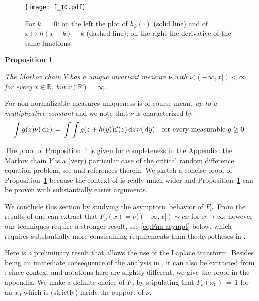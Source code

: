 \documentclass[reqno,11pt]{amsart}
\numberwithin{equation}{section}
\newtheorem{proposition}[theorem]{Proposition}
\newcommand{\dd}{\,\text{\rm d}}             %
\newcommand{\bbR}{{\ensuremath{\mathbb R}} }
\newcommand{\gz}{\zeta}
\begin{document}
\begin{figure}[h]
\centering
\texttt{[image: f\_10.pdf]}
\caption{\label{fig:1} For $k=10$: on the left the plot of $h_k(\cdot)$ (solid line) and of $x\mapsto h(x+k)-k$ (dashed line); on the right the derivative of the same functions. }
\end{figure}

\medskip

\begin{proposition}
\label{th:Y}
\begin{sloppypar}
	The Markov chain $Y$ has a unique   invariant measure $\nu$ with ${\nu((-\infty,x])< \infty}$ for every $x\in \bbR$, but
	$\nu(\bbR)= \infty$. 
\end{sloppypar}
\end{proposition}
\medskip

For non-normalizable measures uniqueness is of course meant \emph{up to  a multiplicative constant} and we note that $\nu$ is characterized by 
\begin{equation}
\label{eq:fornu}
\int  g(z) \nu (\dd z)\, =\, \int \int g(z +h(y)) \gz(z) \dd z \, \nu (\dd y)\ \ \text{ for every measurable } g \ge 0\,  .
\end{equation}

The proof of Proposition~\ref{th:Y} is  given for completeness in the Appendix: the Markov chain $Y$ is a (very) particular case of the critical   random difference equation problem, see   \cite{cf:BBE,cf:BBD,cf:BDMbook} and references therein. 
We sketch a concise proof of Proposition~\ref{th:Y} because the context of \cite{cf:BBE,cf:BBD,cf:BDMbook} is really much wider and Proposition~\ref{th:Y} can be proven with substantially easier arguments. 

\medskip

We conclude this section by studying the asymptotic behavior of $F_\nu$.
From the results of
\cite{cf:BBD,cf:BDMbook} one can  extract that $F_\nu (x)=\nu((-\infty,x]) \sim  c x$ for $x \to \infty$;
however our techniques require a stronger result, see  \eqref{eq:Fnu-asympt} below, which requires substantially more constraining requirements than the hypotheses in \cite{cf:BBD,cf:BDMbook}. 








Here is a preliminary result that allows the use of the Laplace transform.  Besides being an immediate consequence of the analysis in  \cite{cf:BBD,cf:BDMbook}, it can also be extracted from   \cite[Lemma~3.3]{cf:GGG}: since context and notations  here are slightly different, we give the proof in the appendix. We make a definite choice of $F_\nu$ by stipulating that 
$F_\nu\left(x_0\right) \, =\, 1$ for an $x_0$ which  is (strictly) inside the support of $\nu$.
\end{document}
